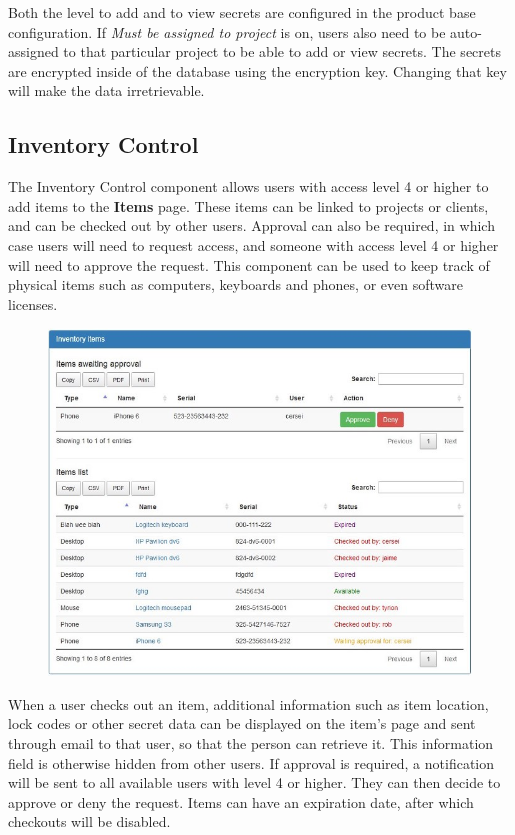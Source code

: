 \documentclass[11pt]{article}
\begin{document}
Both the level to add and to view secrets are configured in the product base configuration. If \textit{Must be assigned to project} is on, users also need to be auto-assigned to that particular project to be able to add or view secrets. The secrets are encrypted inside of the database using the encryption key. Changing that key will make the data irretrievable.

\subsection{Inventory Control}
The Inventory Control component allows users with access level 4 or higher to add items to the \textbf{Items} page. These items can be linked to projects or clients, and can be checked out by other users. Approval can also be required, in which case users will need to request access, and someone with access level 4 or higher will need to approve the request. This component can be used to keep track of physical items such as computers, keyboards and phones, or even software licenses.

\begin{figure}[h]
\includegraphics{items.jpg}
\end{figure}

When a user checks out an item, additional information such as item location, lock codes or other secret data can be displayed on the item's page and sent through email to that user, so that the person can retrieve it. This information field is otherwise hidden from other users. If approval is required, a notification will be sent to all available users with level 4 or higher. They can then decide to approve or deny the request. Items can have an expiration date, after which checkouts will be disabled.
\end{document}
